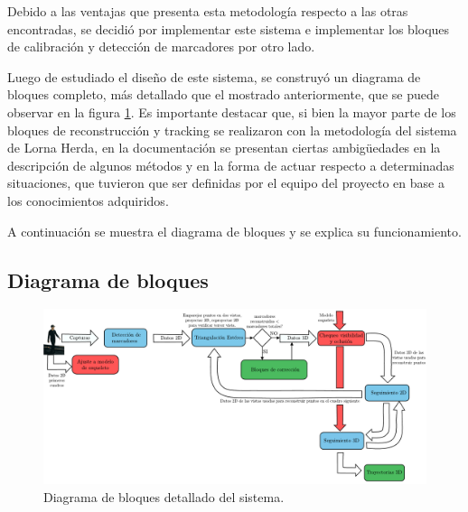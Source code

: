 Debido a las ventajas que presenta esta metodología respecto a las otras encontradas, se decidió por implementar este sistema e implementar los bloques de calibración y detección de marcadores por otro lado.

Luego de estudiado el diseño de este sistema, se construyó un diagrama de bloques completo, más detallado que el mostrado anteriormente, que se puede observar en la figura \ref{diagBloq}. Es importante destacar que, si bien la mayor parte de los bloques de reconstrucción y tracking se realizaron con la metodología del sistema de Lorna Herda\cite{herda}, en la documentación se presentan ciertas ambigüedades en la descripción de algunos métodos y en la forma de actuar respecto a determinadas situaciones, que tuvieron que ser definidas por el equipo del proyecto en base a los conocimientos adquiridos.

A continuación se muestra el diagrama de bloques y se explica su funcionamiento.

\subsection{Diagrama de bloques}
\vspace{-1cm}
\begin{figure}[ht!]
\begin{center}
\includegraphics[scale=0.65]{img/Sistema_completo/Diagramadebloques_Herda.pdf}
\end{center}
\vspace{-1cm}
\caption{Diagrama de bloques detallado del sistema.}
\label{diagBloq}
\end{figure}

